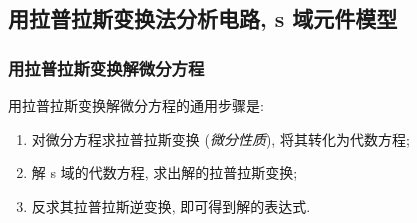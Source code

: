 \subsection{用拉普拉斯变换法分析电路, s 域元件模型} \label{4 用拉普拉斯变换法分析电路, s 域元件模型}
\subsubsection{用拉普拉斯变换解微分方程}
用拉普拉斯变换解微分方程的通用步骤是:
\begin{enumerate}
    \item 对微分方程求拉普拉斯变换 (\textit{微分性质}), 将其转化为代数方程;
    \item 解 s 域的代数方程, 求出解的拉普拉斯变换;
    \item 反求其拉普拉斯逆变换, 即可得到解的表达式.
\end{enumerate}

